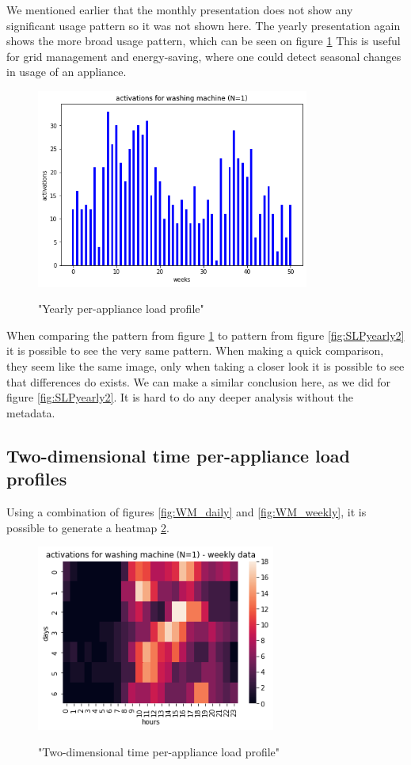 We mentioned earlier that the monthly presentation does not show any significant usage pattern so it was not shown here. 
The yearly presentation again shows the more broad usage pattern, which can be seen on figure \ref{fig:WM_yearly}
This is useful for grid management and energy-saving,
where one could detect seasonal changes in usage of an appliance. 

\begin{figure}[H]
	\centering
	\caption{"Yearly per-appliance load profile"}
	\includegraphics[width=0.8\textwidth]{../Figures/LPS/WM_yearly.png}
	\label{fig:WM_yearly}
\end{figure}

When comparing the pattern from figure \ref{fig:WM_yearly} to pattern from figure \ref{fig:SLPyearly2} 
it is possible to see the very same pattern. When making a quick comparison, they seem like the same image,
only when taking a closer look it is possible to see that differences do exists. 
We can make a similar conclusion here, as we did for figure \ref{fig:SLPyearly2}.
It is hard to do any deeper analysis without the metadata.

\subsection{Two-dimensional time per-appliance load profiles}

Using a combination of figures \ref{fig:WM_daily} and \ref{fig:WM_weekly},
it is possible to generate a heatmap \ref{fig:wm_hm_weekly}.

\begin{figure}[H]
	\centering
	\caption{"Two-dimensional time per-appliance load profile"}
	\includegraphics[width=0.7\textwidth]{../Figures/LPS/wm_hm_weekly.png}
	\label{fig:wm_hm_weekly}
\end{figure}

